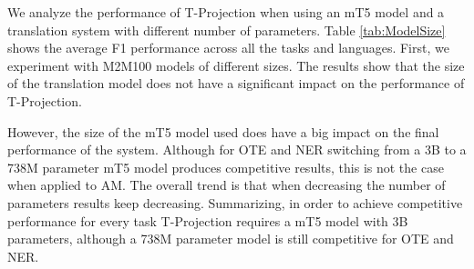 \documentclass[11pt]{article}
\begin{document}
We analyze the performance of T-Projection when using an mT5 model and a
translation system with different number of parameters. Table \ref{tab:ModelSize}
shows the average F1 performance across all the tasks and languages. First, we
experiment with M2M100 models of different sizes. The results show that the size of the
translation model does not have a significant impact on the performance of T-Projection.

However, the size of the mT5 model used does have a big impact on the final
performance of the system. Although for OTE and NER switching from a 3B to a
738M parameter mT5 model produces competitive results, this is not the case when
applied to AM. The overall trend is that when decreasing the number of parameters
results keep decreasing. Summarizing, in order to achieve competitive
performance for every task T-Projection requires a mT5 model with 3B parameters,
although a 738M parameter model is still competitive for OTE and NER. 
\end{document}
